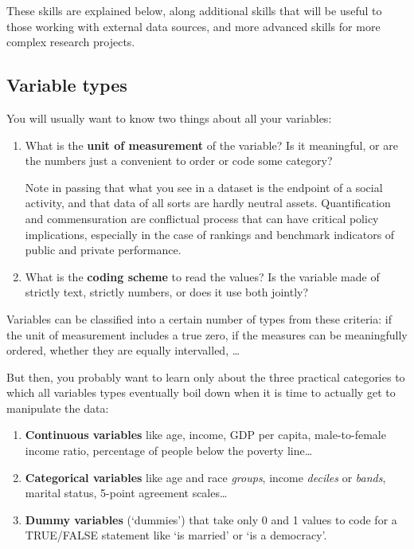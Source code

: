 These skills are explained below, along additional skills that will be useful to those working with external data sources, and more advanced skills for more complex research projects.%

%
%
\subsection{Variable types}
\label{sec:variable-types}

You will usually want to know two things about all your variables:

\begin{enumerate}
	\item What is the \textbf{unit of measurement} of the variable? Is it meaningful, or are the numbers just a convenient to order or code some category?
	
Note in passing that what you see in a dataset is the endpoint of a social activity, and that data of all sorts are hardly neutral assets. Quantification and commensuration are conflictual process that can have critical policy implications, especially in the case of rankings and benchmark indicators of public and private performance.%

	\item What is the \textbf{coding scheme} to read the values? Is the variable made of strictly text, strictly numbers, or does it use both jointly?
\end{enumerate}

Variables can be classified into a certain number of types from these criteria: if the unit of measurement includes a true zero, if the measures can be meaningfully ordered, whether they are equally intervalled, …

But then, you probably want to learn only about the three practical categories to which all variables types eventually boil down when it is time to actually get to manipulate the data:

\begin{enumerate}
	\item \textbf{Continuous variables} like age, income, GDP per capita, male-to-female income ratio, percentage of people below the poverty line…
	\item \textbf{Categorical variables} like age and race \emph{groups}, income \emph{deciles} or \emph{bands}, marital status, 5-point agreement scales…
	\item \textbf{Dummy variables} (`dummies') that take only 0 and 1 values to code for a TRUE/FALSE statement like `is married' or `is a democracy'.
\end{enumerate}

